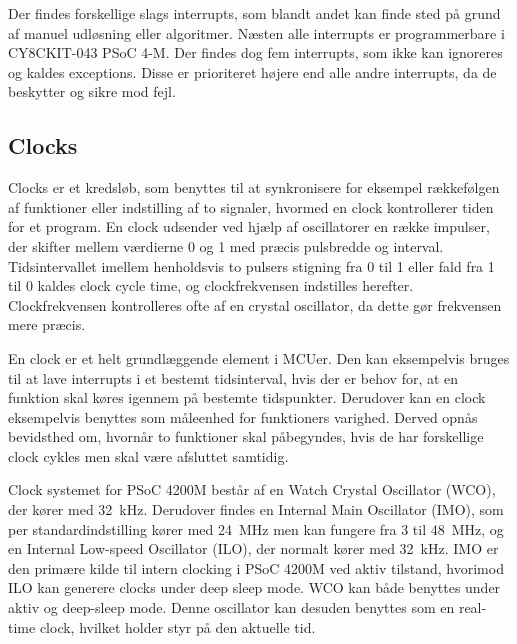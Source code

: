 Der findes forskellige slags interrupts, som blandt andet kan finde sted på grund af manuel udløsning eller algoritmer. Næsten alle interrupts er programmerbare i CY8CKIT-043 PSoC 4-M. Der findes dog fem interrupts, som ikke kan ignoreres og kaldes exceptions. Disse er prioriteret højere end alle andre interrupts, da de beskytter og sikre mod fejl.~\citep{Badiger2016}

\subsection{Clocks}
Clocks er et kredsløb, som benyttes til at synkronisere for eksempel rækkefølgen af funktioner eller indstilling af to signaler, hvormed en clock kontrollerer tiden for et program. En clock udsender ved hjælp af oscillatorer en række impulser, der skifter mellem værdierne 0 og 1 med præcis pulsbredde og interval. Tidsintervallet imellem henholdsvis to pulsers stigning fra 0 til 1 eller fald fra 1 til 0 kaldes clock cycle time, og clockfrekvensen indstilles herefter. Clockfrekvensen kontrolleres ofte af en crystal oscillator, da dette gør frekvensen mere præcis.~\citep{Tanenbaum2006}

En clock er et helt grundlæggende element i MCUer. Den kan eksempelvis bruges til at lave interrupts i et bestemt tidsinterval, hvis der er behov for, at en funktion skal køres igennem på bestemte tidspunkter. Derudover kan en clock eksempelvis benyttes som måleenhed for funktioners varighed. Derved opnås bevidsthed om, hvornår to funktioner skal påbegyndes, hvis de har forskellige clock cykles men skal være afsluttet samtidig.~\citep{Tanenbaum2006}

Clock systemet for PSoC 4200M består af en Watch Crystal Oscillator (WCO), der kører med 32~kHz. Derudover findes en Internal Main Oscillator (IMO), som per standardindstilling kører med 24~MHz men kan fungere fra 3 til 48~MHz, og en Internal Low-speed Oscillator (ILO), der normalt kører med 32~kHz. IMO er den primære kilde til intern clocking i PSoC 4200M ved aktiv tilstand, hvorimod ILO kan generere clocks under deep sleep mode. WCO kan både benyttes under aktiv og deep-sleep mode. Denne oscillator kan desuden benyttes som en real-time clock, hvilket holder styr på den aktuelle tid.~\citep{Semiconductor20164200M}

